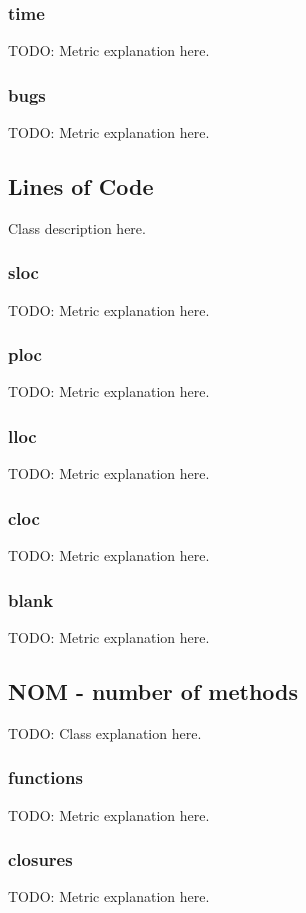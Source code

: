 \subsubsection{time}
TODO: Metric explanation here.
\subsubsection{bugs}
TODO: Metric explanation here.
\subsection{Lines of Code}

Class description here.

\subsubsection{sloc}
TODO: Metric explanation here.
\subsubsection{ploc}
TODO: Metric explanation here.
\subsubsection{lloc}
TODO: Metric explanation here.
\subsubsection{cloc}
TODO: Metric explanation here.
\subsubsection{blank}
TODO: Metric explanation here.

\subsection{NOM - number of methods}

TODO: Class explanation here.

\subsubsection{functions}
TODO: Metric explanation here.

\subsubsection{closures}
TODO: Metric explanation here.


